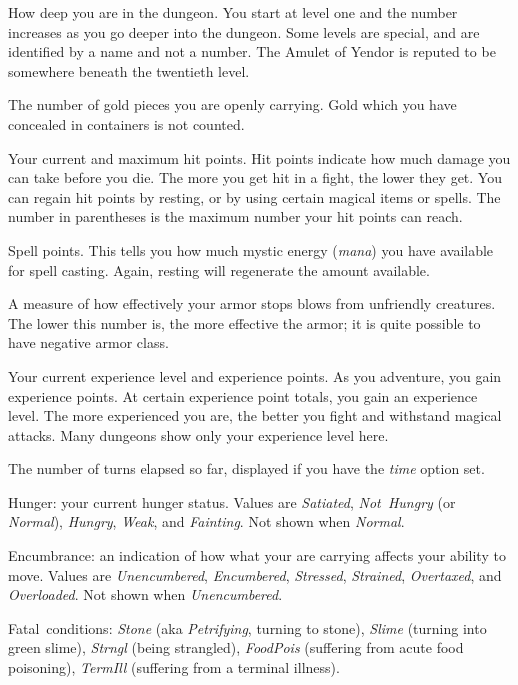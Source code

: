 \item[\bb{Dungeon Level}]
How deep you are in the dungeon.  You start at level one and the number
increases as you go deeper into the dungeon.  Some levels are special,
and are identified by a name and not a number.  The Amulet of Yendor is
reputed to be somewhere beneath the twentieth level.
\item[\bb{Gold}]
The number of gold pieces you are openly carrying.  Gold which you have
concealed in containers is not counted.
\item[\bb{Hit Points}]
Your current and maximum hit points.  Hit points indicate how much
damage you can take before you die.  The more you get hit in a fight,
the lower they get.  You can regain hit points by resting, or by using
certain magical items or spells.  The number in parentheses is the maximum
number your hit points can reach.
\item[\bb{Power}]
Spell points.  This tells you how much mystic energy ({\it mana\/})
you have available for spell casting.  Again, resting will regenerate the
amount available.
\item[\bb{Armor Class}]
A measure of how effectively your armor stops blows from unfriendly
creatures.  The lower this number is, the more effective the armor; it
is quite possible to have negative armor class.
\item[\bb{Experience}]
Your current experience level and experience points.  As you
adventure, you gain experience points.  At certain experience point
totals, you gain an experience level.  The more experienced you are,
the better you fight and withstand magical attacks.  Many dungeons
show only your experience level here.
\item[\bb{Time}]
The number of turns elapsed so far, displayed if you have the
{\it time\/} option set.
\item[\bb{Status}]
Hunger:
your current hunger status.
Values are {\it Satiated}, {\it Not~Hungry\/} (or {\it Normal\/}),
{\it Hungry}, {\it Weak}, and {\it Fainting}.
Not shown when {\it Normal}.

Encumbrance:
an indication of how what your are carrying affects your ability to move.
Values are {\it Unencumbered}, {\it Encumbered}, {\it Stressed},
{\it Strained}, {\it Overtaxed}, and {\it Overloaded}.
Not shown when {\it Unencumbered}.

Fatal~conditions:
{\it Stone\/} (aka {\it Petrifying}, turning to stone),
{\it Slime\/} (turning into green slime),
{\it Strngl\/} (being strangled),
{\it FoodPois\/} (suffering from acute food poisoning),
{\it TermIll\/} (suffering from a terminal illness).

